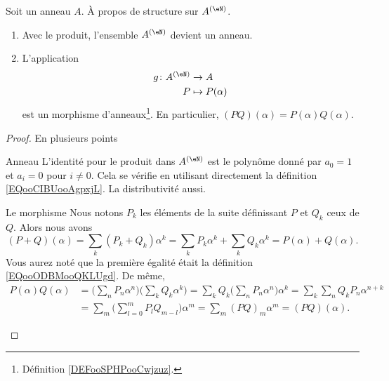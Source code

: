 \begin{proposition}     \label{PROPooGDQCooHziCPH}
    Soit un anneau \( A\). À propos de structure sur \( A^{(\eN)}\).
    \begin{enumerate}
        \item
            Avec le produit, l'ensemble \( A^{(\eN)}\) devient un anneau.
        \item
    L'application
    \begin{equation}
        \begin{aligned}
            g\colon A^{(\eN)}&\to A \\
            P&\mapsto P(\alpha)
        \end{aligned}
    \end{equation}
    est un morphisme d'anneaux\footnote{Définition \ref{DEFooSPHPooCwjzuz}.}. En particulier, \( (PQ)(\alpha)=P(\alpha)Q(\alpha)\).
    \end{enumerate}
\end{proposition}

\begin{proof}
    En plusieurs points
    \begin{subproof}
        \item[Anneau]
            L'identité pour le produit dans \( A^{(\eN)}\) est le polynôme donné par \( a_0=1\) et \( a_i=0\) pour \( i\neq 0\). Cela se vérifie en utilisant directement la définition \eqref{EQooCIBUooAgpxjL}. La distributivité aussi.
        \item[Le morphisme]
    Nous notons \( P_k\) les éléments de la suite définissant \( P\) et \( Q_k\) ceux de \( Q\). Alors nous avons
    \begin{equation}
        (P+Q)(\alpha)=\sum_k(P_k+Q_k)\alpha^k=\sum_kP_k\alpha^k+\sum_kQ_k\alpha^k=P(\alpha)+Q(\alpha).
    \end{equation}
    Vous aurez noté que la première égalité était la définition \eqref{EQooODBMooQKLUgd}. De même,
    \begin{subequations}
        \begin{align}
            P(\alpha)Q(\alpha)&=\big( \sum_nP_n\alpha^n \big)\big( \sum_kQ_k\alpha^k \big)=\sum_kQ_k\big( \sum_nP_n\alpha^n \big)\alpha^k=\sum_k\sum_nQ_kP_n\alpha^{n+k}\\
            &=\sum_m\big( \sum_{l=0}^mP_lQ_{m-l} \big)\alpha^m=\sum_m(PQ)_m\alpha^m=(PQ)(\alpha).
        \end{align}
    \end{subequations}
    \end{subproof}
\end{proof}

